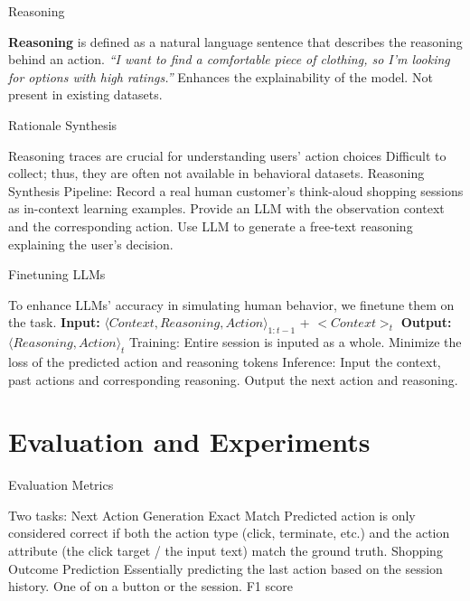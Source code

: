 \documentclass[scheme=plain]{beamer}
\begin{document}
\begin{frame}{Reasoning}
  \begin{outline}
    \1 \textbf{Reasoning} is defined as a natural language sentence that describes the reasoning behind an action.
      \2 \textit{``I want to find a comfortable piece of clothing, so I’m looking for options with high ratings.''}
    \1 Enhances the explainability of the model.
    \1 Not present in existing datasets.
  \end{outline}
  
\end{frame}

\begin{frame}{Rationale Synthesis}
  \begin{outline}
    \1 Reasoning traces are crucial for understanding users' action choices
    \1 Difficult to collect; thus, they are often not available in behavioral datasets.
    \1 Reasoning Synthesis Pipeline:
      \2 Record a real human customer's think-aloud shopping sessions as in-context learning examples.
      \2 Provide an LLM with the observation context and the corresponding action.
      \2 Use LLM to generate a free-text reasoning explaining the user's decision.
  \end{outline}  
\end{frame}

\begin{frame}{Finetuning LLMs}
  \begin{outline}
    \1 To enhance LLMs' accuracy in simulating human behavior, we finetune them on the task.
    \2 \textbf{Input:} ${\langle Context, Reasoning, Action\rangle}_{1:t-1}$ + $<Context>_t$ 
    \2 \textbf{Output:} $\langle Reasoning, Action\rangle _{t}$
    \1 Training:
      \2 Entire session is inputed as a whole.
      \2 Minimize the loss of the predicted action and reasoning tokens
    \1 Inference:
      \2 Input the context, past actions and corresponding reasoning.
      \2 Output the next action and reasoning.
  \end{outline}
\end{frame}

\section{Evaluation and Experiments}

\begin{frame}{Evaluation Metrics}
  \begin{outline}
    \1 Two tasks: 
    \1 Next Action Generation
      \2 Exact Match
      \2 Predicted action is only considered correct if both the action type (click, terminate, etc.) and the action attribute (the click target / the input text) match the ground truth.
      \pause
    \1 Shopping Outcome Prediction
      \2 Essentially predicting the last action based on the session history.
      \2 One of  on a  button or  the session.
      \2 F1 score
  \end{outline}
\end{frame}
\end{document}
